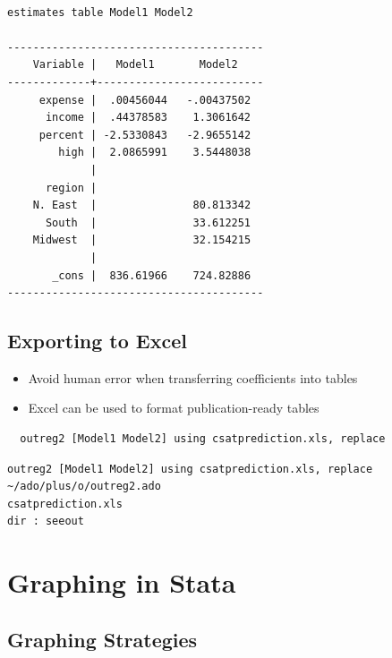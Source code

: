 \documentclass[]{book}
\providecommand{\tightlist}{%
  \setlength{\itemsep}{0pt}\setlength{\parskip}{0pt}}
\begin{document}
\begin{verbatim}

estimates table Model1 Model2

----------------------------------------
    Variable |   Model1       Model2    
-------------+--------------------------
     expense |  .00456044   -.00437502  
      income |  .44378583    1.3061642  
     percent | -2.5330843   -2.9655142  
        high |  2.0865991    3.5448038  
             |
      region |
    N. East  |               80.813342  
      South  |               33.612251  
    Midwest  |               32.154215  
             |
       _cons |  836.61966    724.82886  
----------------------------------------
\end{verbatim}

\hypertarget{exporting-to-excel}{%
\subsection{Exporting to Excel}\label{exporting-to-excel}}

\begin{itemize}
\tightlist
\item
  Avoid human error when transferring coefficients into tables
\item
  Excel can be used to format publication-ready tables
\end{itemize}

\begin{verbatim}
  outreg2 [Model1 Model2] using csatprediction.xls, replace
\end{verbatim}

\begin{verbatim}
outreg2 [Model1 Model2] using csatprediction.xls, replace
~/ado/plus/o/outreg2.ado
csatprediction.xls
dir : seeout
\end{verbatim}

\hypertarget{graphing-in-stata}{%
\section{Graphing in Stata}\label{graphing-in-stata}}

\hypertarget{graphing-strategies}{%
\subsection{Graphing Strategies}\label{graphing-strategies}}
\end{document}
